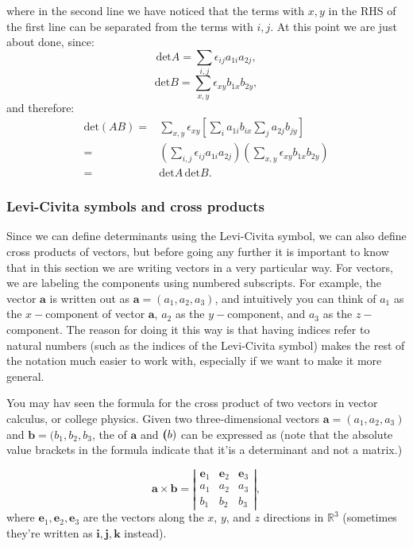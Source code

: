 where in the second line we have noticed that the terms with $x,y$ in the RHS of the first line can be separated from the terms with $i,j$.
At this point we are just about done, since:
\[
\text{det}A=\sum_{i,j} \epsilon_{ij} a_{1i}a_{2j},
\]
\[
\text{det}B=\sum_{x,y} \epsilon_{xy} b_{1x}b_{2y},
\]
and therefore:
\begin{align*}
\text{det}(AB)=& \sum_{x,y} \epsilon_{xy} \left[ \sum_i a_{1i}b_{ix} \sum_j a_{2j}b_{jy}\right]\\
=&  \left(\sum_{i,j}\epsilon_{ij}   a_{1i}a_{2j}\right)\left(\sum_{x,y}  \epsilon_{xy} b_{1x}b_{2y}\right)\\
=& \text{det}A \,\text{det}B.
\end{align*}




\subsubsection*{Levi-Civita symbols and cross products}
Since we can define determinants using the Levi-Civita symbol, we can also define cross products of vectors, but before going any further it is important to know that in this section we are writing vectors in a very particular way.  For vectors, we are labeling the components using numbered subscripts.  For example, the vector $\textbf{a}$ is written out as $\textbf{a}=(a_1, a_2, a_3)$, and intuitively you can think of $a_1$ as the $x-$component of vector $\textbf{a}$, $a_2$ as the $y-$component, and $a_3$ as the $z-$component.  The reason for doing it this way is that having indices refer to natural numbers (such as the indices of the Levi-Civita symbol) makes the rest of the notation much easier to work with, especially if we want to make it more general.   

You may hav seen the formula for the cross product of two vectors in vector calculus, or college physics. Given two three-dimensional vectors $\textbf{a}=(a_1, a_2, a_3)$ and $\textbf{b}=(b_1, b_2, b_3$, the  of $\textbf{a}$ and $\textbf(b)$ can be expressed as  (note that the absolute value brackets in the formula  indicate that it'is a determinant and not a matrix.)

\[ \textbf{a} \times \textbf{b}=
 \left| \begin{array}{ccc}
\textbf{e}_1 & \textbf{e}_2  & \textbf{e}_3  \\
a_1 & a_2 & a_3 \\
b_1 & b_2 & b_3 \end{array} \right|,\]
where $\textbf{e}_1,  \textbf{e}_2 , \textbf{e}_3$ are the vectors along the $x$, $y$, and $z$ directions  in $\mathbb{R}^3$ (sometimes they're written as $\textbf{i}, \textbf{j}, \textbf{k}$ instead).

